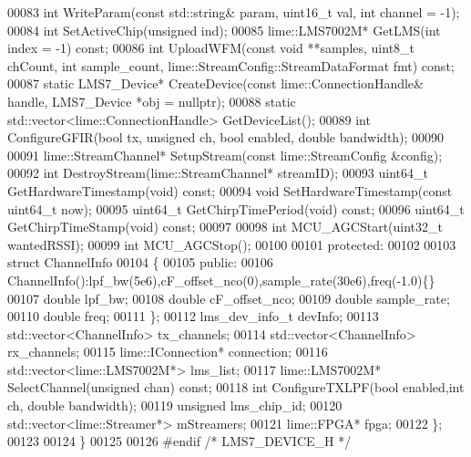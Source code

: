 \begin{DoxyCode}
00083     \textcolor{keywordtype}{int} WriteParam(\textcolor{keyword}{const} std::string& param, uint16\_t val, \textcolor{keywordtype}{int} channel = -1);
00084     \textcolor{keywordtype}{int} SetActiveChip(\textcolor{keywordtype}{unsigned} ind);
00085     lime::LMS7002M* GetLMS(\textcolor{keywordtype}{int} index = -1) \textcolor{keyword}{const};
00086     \textcolor{keywordtype}{int} UploadWFM(\textcolor{keyword}{const} \textcolor{keywordtype}{void} **samples, uint8\_t chCount, \textcolor{keywordtype}{int} sample_count, 
      lime::StreamConfig::StreamDataFormat fmt) \textcolor{keyword}{const};
00087     \textcolor{keyword}{static} LMS7_Device* CreateDevice(\textcolor{keyword}{const} lime::ConnectionHandle& handle, 
      LMS7_Device *obj = \textcolor{keyword}{nullptr});
00088     \textcolor{keyword}{static} std::vector<lime::ConnectionHandle> GetDeviceList();
00089     \textcolor{keywordtype}{int} ConfigureGFIR(\textcolor{keywordtype}{bool} tx, \textcolor{keywordtype}{unsigned} ch, \textcolor{keywordtype}{bool} enabled, \textcolor{keywordtype}{double} bandwidth);
00090 
00091     lime::StreamChannel* SetupStream(\textcolor{keyword}{const} lime::StreamConfig &config);
00092     \textcolor{keywordtype}{int} DestroyStream(lime::StreamChannel* streamID);
00093     uint64\_t GetHardwareTimestamp(\textcolor{keywordtype}{void}) \textcolor{keyword}{const};
00094     \textcolor{keywordtype}{void} SetHardwareTimestamp(\textcolor{keyword}{const} uint64\_t now);
00095     uint64\_t GetChirpTimePeriod(\textcolor{keywordtype}{void}) \textcolor{keyword}{const};
00096     uint64\_t GetChirpTimeStamp(\textcolor{keywordtype}{void}) \textcolor{keyword}{const};
00097 
00098     \textcolor{keywordtype}{int} MCU\_AGCStart(uint32\_t wantedRSSI);
00099     \textcolor{keywordtype}{int} MCU\_AGCStop();
00100 
00101 \textcolor{keyword}{protected}:
00102 
00103     \textcolor{keyword}{struct }ChannelInfo
00104     \{
00105     \textcolor{keyword}{public}:
00106         ChannelInfo():lpf\_bw(5e6),cF\_offset\_nco(0),sample\_rate(30e6),freq(-1.0)\{\}
00107         \textcolor{keywordtype}{double} lpf_bw;
00108         \textcolor{keywordtype}{double} cF_offset_nco;
00109         \textcolor{keywordtype}{double} sample_rate;
00110         \textcolor{keywordtype}{double} freq;
00111     \};
00112     lms_dev_info_t devInfo;
00113     std::vector<ChannelInfo> tx_channels;
00114     std::vector<ChannelInfo> rx_channels;
00115     lime::IConnection* connection;
00116     std::vector<lime::LMS7002M*> lms_list;
00117     lime::LMS7002M* SelectChannel(\textcolor{keywordtype}{unsigned} chan) \textcolor{keyword}{const};
00118     \textcolor{keywordtype}{int} ConfigureTXLPF(\textcolor{keywordtype}{bool} enabled,\textcolor{keywordtype}{int} ch, \textcolor{keywordtype}{double} bandwidth);
00119     \textcolor{keywordtype}{unsigned} lms_chip_id;
00120     std::vector<lime::Streamer*> mStreamers;
00121     lime::FPGA* fpga;
00122 \};
00123 
00124 \}
00125 
00126 \textcolor{preprocessor}{#endif  }\textcolor{comment}{/* LMS7\_DEVICE\_H */}\textcolor{preprocessor}{}
\end{DoxyCode}
